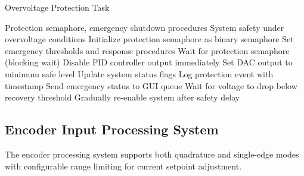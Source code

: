 \documentclass{article}
\begin{document}
\begin{algorithm}
\caption{Overvoltage Protection Task}
\label{alg:overvoltage_protection}
\begin{algorithmic}[1]
\REQUIRE Protection semaphore, emergency shutdown procedures
\ENSURE System safety under overvoltage conditions
\STATE Initialize protection semaphore as binary semaphore
\STATE Set emergency thresholds and response procedures
    \STATE Wait for protection semaphore (blocking wait)
    \STATE {}
    \STATE Disable PID controller output immediately
    \STATE Set DAC output to minimum safe level
    \STATE Update system status flags
    \STATE Log protection event with timestamp
    \STATE {}
    \STATE Send emergency status to GUI queue
    \STATE {}
    \STATE Wait for voltage to drop below recovery threshold
    \STATE Gradually re-enable system after safety delay
\ENDWHILE
\end{algorithmic}
\end{algorithm}

\subsection{Encoder Input Processing System}

The encoder processing system supports both quadrature and single-edge modes with configurable range limiting for current setpoint adjustment.
\end{document}
